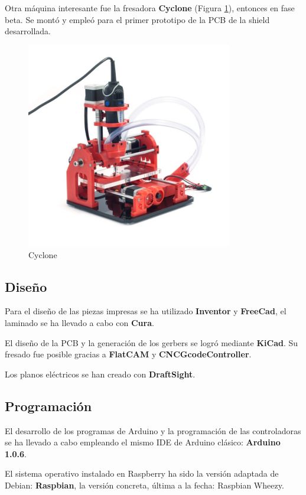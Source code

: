 Otra máquina interesante fue la fresadora \textbf{Cyclone} (Figura \ref{fig:cyclone}), entonces en fase beta. Se montó y empleó para el primer prototipo de la PCB de la shield desarrollada.

\begin{figure}[h]
\centering
\includegraphics[width=90mm]{Figures/cyclone.jpg}
\caption[Cyclone]{Cyclone}
\label{fig:cyclone}
\end{figure}

\subsection{Diseño}

Para el diseño de las piezas impresas se ha utilizado \textbf{Inventor} y \textbf{FreeCad}, el laminado se ha llevado a cabo con \textbf{Cura}.

El diseño de la PCB y la generación de los gerbers se logró mediante \textbf{KiCad}. Su fresado fue posible gracias a \textbf{FlatCAM} y \textbf{CNCGcodeController}.

Los planos eléctricos se han creado con \textbf{DraftSight}.

\subsection{Programación}

El desarrollo de los programas de Arduino y la programación de las controladoras se ha llevado a cabo empleando el mismo IDE de Arduino clásico: \textbf{Arduino 1.0.6}.

El sistema operativo instalado en Raspberry ha sido la versión adaptada de Debian: \textbf{Raspbian}, la versión concreta, última a la fecha: Raspbian Wheezy.

